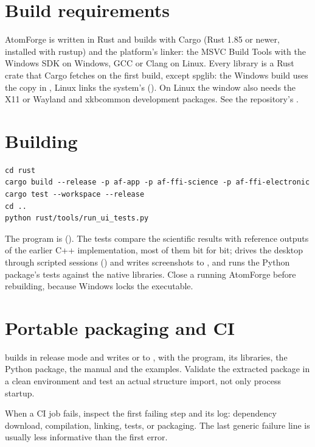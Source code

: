 \section{Build requirements}
AtomForge is written in Rust and builds with Cargo (Rust 1.85 or newer, installed with rustup) and the platform's linker: the MSVC Build Tools with the Windows SDK on Windows, GCC or Clang on Linux. Every library is a Rust crate that Cargo fetches on the first build, except spglib: the Windows build uses the copy in , Linux links the system's  (). On Linux the window also needs the X11 or Wayland and xkbcommon development packages. See the repository's .

\section{Building}
\begin{lstlisting}
cd rust
cargo build --release -p af-app -p af-ffi-science -p af-ffi-electronic
cargo test --workspace --release
cd ..
python rust/tools/run_ui_tests.py
\end{lstlisting}
The program is  (). The tests compare the scientific results with reference outputs of the earlier C++ implementation, most of them bit for bit;  drives the desktop through scripted sessions () and writes screenshots to , and  runs the Python package's tests against the native libraries. Close a running AtomForge before rebuilding, because Windows locks the executable.

\section{Portable packaging and CI}
 builds in release mode and writes  or  to , with the program, its libraries, the Python package, the manual and the examples. Validate the extracted package in a clean environment and test an actual structure import, not only process startup.

When a CI job fails, inspect the first failing step and its log: dependency download, compilation, linking, tests, or packaging. The last generic failure line is usually less informative than the first error.

